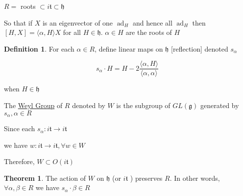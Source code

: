 \documentclass{article}
\theoremstyle{definition}
\newtheorem{definition}{Definition}
\newtheorem{theorem}{Theorem}
\newcommand{\ad}{\operatorname{ad}}
\begin{document}
\(R=\) roots \(\subset i\mathfrak{t} \subset \mathfrak{h} \) 

So that if \(X\) is an eigenvector of one \(\ad_H\) and hence all \(\ad_H\) then \([H,X]= \langle \alpha ,H \rangle X\) for all \(H\in \mathfrak{h} \). \(\alpha \in H\) are the roots of \(H\)

\begin{definition}
    For each \(\alpha \in R\), define linear maps on \(\mathfrak{h} \) [reflection] denoted \(s_\alpha\) 
    
    \[
        s_\alpha \cdot H = H - 2 \frac{\langle \alpha , H \rangle }{\langle \alpha ,\alpha \rangle }
    \]

    when \(H\in \mathfrak{h} \) 

    The \underline{Weyl Group} of \(R\) denoted by \(W\) is the subgroup of \(GL(\mathfrak{g} )\) generated by \(s_\alpha,\alpha \in R\) 

\end{definition}

Since each \(s_\alpha : i\mathfrak{t} \to i \mathfrak{t} \)

we have \(w: i\mathfrak{t} \to i \mathfrak{t}, \forall w\in W \) 

Therefore, \(W \subset O(i \mathfrak{t} )\) 



\begin{theorem}

    The action of \(W\) on \(\mathfrak{h} \) (or \(i\mathfrak{t} \) ) preserves \(R\). In other words, \(\forall \alpha ,\beta \in R\) we have \(s_\alpha \cdot \beta \in R\) 

\end{theorem}
\end{document}
